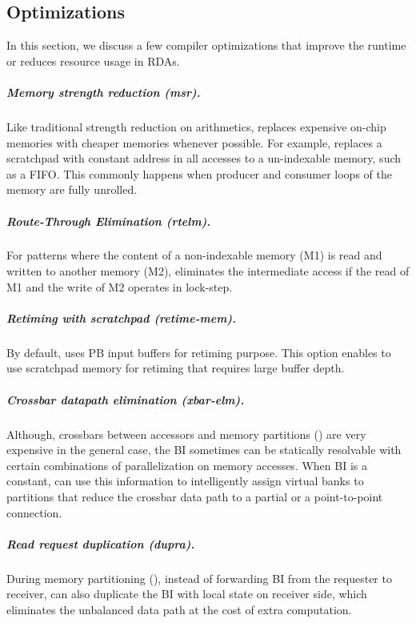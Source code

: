 \subsection{Optimizations}\label{sec:opt}
In this section, we discuss a few compiler optimizations that improve the runtime or reduces resource usage in RDAs.

\subparagraph{Memory strength reduction (msr).} Like traditional strength reduction on arithmetics, \name{} replaces expensive on-chip memories with cheaper memories whenever possible.
For example, \name{} replaces a scratchpad with constant address in all accesses to a un-indexable memory, such as a FIFO.
This commonly happens when producer and consumer loops of the memory are fully unrolled.

\subparagraph{Route-Through Elimination (rtelm).} For patterns where the content of a non-indexable memory  (M1) is read and written to another memory (M2), \name{} eliminates the intermediate access if the read of M1 and the write of M2 operates in lock-step.

\subparagraph{Retiming with scratchpad (retime-mem).} By default, \name{} uses PB input buffers for retiming purpose. 
This option enables \name{} to use scratchpad memory for retiming that requires large buffer depth.

\subparagraph{Crossbar datapath elimination (xbar-elm).}
Although, crossbars between accessors and memory partitions () are very expensive in the general case, the BI sometimes can be statically resolvable with certain combinations of parallelization on memory accesses. 
When BI is a constant, \name{} can use this information to intelligently assign virtual banks to partitions that reduce the crossbar data path to a partial or a point-to-point connection.

\subparagraph{Read request duplication (dupra).} During memory partitioning (), instead of forwarding BI from the requester to receiver, \name{} can also duplicate the BI with local state on receiver side, which
eliminates the unbalanced data path at the cost of extra computation.

